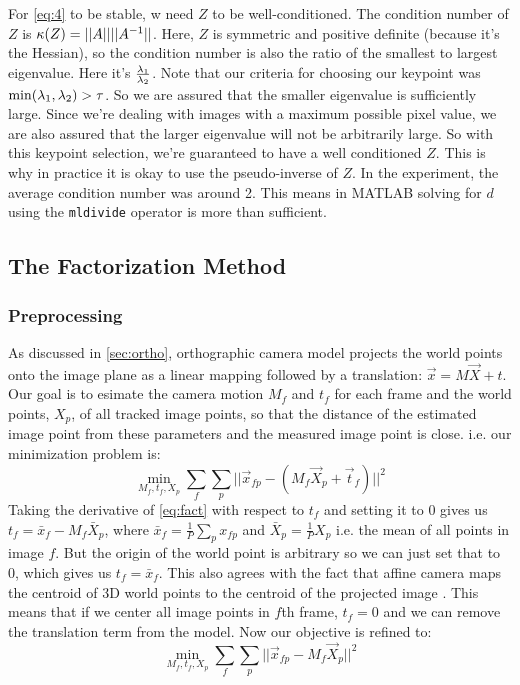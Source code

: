For \eqref{eq:4} to be stable, w need $Z$ to be
well-conditioned. The condition number of $Z$ is $\kappa(Z) =
||A||||A^{-1}||$. Here, $Z$ is symmetric and positive definite (because
it's the Hessian), so the condition number is also the ratio of the
smallest to largest eigenvalue. Here it's $\frac{\lambda_1}{\lambda_2}$.
Note that our criteria for choosing our keypoint was $\min(\lambda_1,
\lambda_2) > \tau$. So we are assured that the smaller eigenvalue is
sufficiently large. Since we're dealing with images with a maximum
possible pixel value, we are also assured that the larger eigenvalue will not be
arbitrarily large. So with this keypoint selection, we're guaranteed to
have a well conditioned $Z$. This is why in practice it is okay to use the pseudo-inverse
of $Z$. In the experiment, the average condition number was around 2. This means in MATLAB solving for $d$ using the
\texttt{mldivide} operator is more than
sufficient.

\subsection{The Factorization Method}
\label{sec:fact}

\subsubsection{Preprocessing}
As discussed in \ref{sec:ortho}, orthographic camera model projects
the world points onto the image plane as a linear mapping followed by
a translation: $\vec x=M\vec X + t$. Our goal is to esimate the camera motion
$M_f$ and $t_f$ for each frame and the world points, $X_p$, of all tracked
image points, so that the distance of the estimated image point from
these parameters and the measured image point is close. i.e. our
minimization problem is:
\begin{equation}
  \label{eq:fact}
\min_{M_f, t_f, X_p}\sum_{f}\sum_p ||\vec x_{fp} - (M_f\vec X_p + \vec
t_f)||^2  
\end{equation}
Taking the derivative of \eqref{eq:fact} with respect to $t_f$ and
setting it to 0 gives us $t_f = \bar x_f - M_f \bar X_p$, where $\bar
x_f =\frac{1}{P}\sum_p x_{fp}$ and $\bar X_p = \frac{1}{P}X_p$
i.e. the mean of all points in image $f$. But the origin of the world
point is arbitrary so we can just set that to 0, which gives us $t_f =
\bar x_f$. This also agrees with the fact that affine camera maps the
centroid of 3D world points to the centroid of the projected image
\cite[p438]{AZ}. This means that if we center all image points in $f$th
frame, $t_f=0$ and we can remove the translation term from the
model. Now our objective is refined to: 
\begin{equation}
  \label{eq:fact2}
\min_{M_f, t_f, X_p}\sum_{f}\sum_p ||\vec x_{fp} - M_f\vec X_p||^2  
\end{equation}

